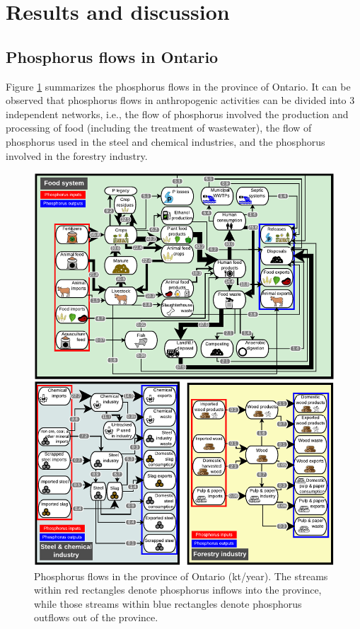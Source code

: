 \documentclass[authoryear]{elsarticle}
\begin{document}
\section{Results and discussion}
\subsection{Phosphorus flows in Ontario}

Figure \ref{fig:FigFlowsSummary} summarizes the phosphorus flows in the province of Ontario. It can be observed that phosphorus flows in anthropogenic activities can be divided into 3 independent networks, i.e., the flow of phosphorus involved the production and processing of food (including the treatment of wastewater), the flow of phosphorus used in the steel and chemical industries, and the phosphorus involved in the forestry industry.

\begin{figure}[H]
	\centering
	\includegraphics[width=0.9\linewidth, trim={0cm 0cm 0cm 0cm},clip]{Figures/Diagram2-3.pdf} 
	\caption{Phosphorus flows in the province of Ontario (kt/year). The streams within red rectangles denote phosphorus inflows into the province, while those streams within blue rectangles denote phosphorus outflows out of the province.}
	\label{fig:FigFlowsSummary}
\end{figure}
\end{document}
